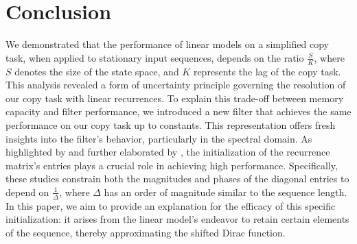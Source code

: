 \vspace{-5mm}
\section{Conclusion}\label{section discussion}

We demonstrated that the performance of linear models on a simplified copy task, when applied to stationary input sequences, depends on the ratio $\frac{S}{K}$, where $S$ denotes the size of the state space, and $K$ represents the lag of the copy task. This analysis revealed a form of uncertainty principle governing the resolution of our copy task with linear recurrences. To explain this trade-off between memory capacity and filter performance, we introduced a new filter that achieves the same performance on our copy task up to constants. This representation offers fresh insights into the filter's behavior, particularly in the spectral domain. As highlighted by \cite{orvieto2023resurrecting} and further elaborated by \cite{gu2022efficiently}, the initialization of the recurrence matrix's entries plays a crucial role in achieving high performance. Specifically, these studies constrain both the magnitudes and phases of the diagonal entries to depend on $\frac{1}{\Delta}$, where $\Delta$ has an order of magnitude similar to the sequence length. In this paper, we aim to provide an explanation for the efficacy of this specific initialization: it arises from the linear model's endeavor to retain certain elements of the sequence, thereby approximating the shifted Dirac function. 

 
